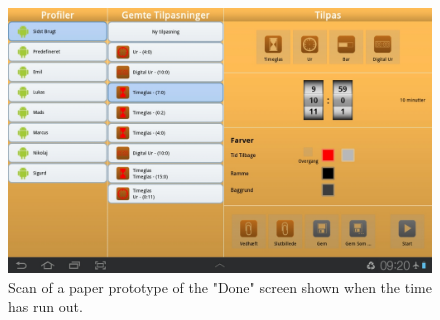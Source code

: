 	\begin{figure}[H]
		\centering
			\includegraphics[width=\textwidth]{Images/Screenshots/last_used.png}
				\caption{Scan of a paper prototype of the "Done" screen shown when the time has run out.}
		\label{fig:last_used_screenshot}
	\end{figure}
	
